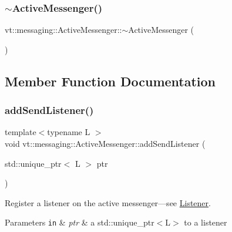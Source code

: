 \subsubsection{\texorpdfstring{$\sim$\+Active\+Messenger()}{~ActiveMessenger()}}
{\footnotesize\ttfamily vt\+::messaging\+::\+Active\+Messenger\+::$\sim$\+Active\+Messenger (\begin{DoxyParamCaption}{ }\end{DoxyParamCaption})\hspace{0.3cm}{\ttfamily [virtual]}}



\subsection{Member Function Documentation}
\mbox{\label{structvt_1_1messaging_1_1_active_messenger_a3083324696bb4f6e55164da2cb00a1c6}} 
\subsubsection{\texorpdfstring{add\+Send\+Listener()}{addSendListener()}}
{\footnotesize\ttfamily template$<$typename L $>$ \\
void vt\+::messaging\+::\+Active\+Messenger\+::add\+Send\+Listener (\begin{DoxyParamCaption}\item[{std\+::unique\+\_\+ptr$<$ L $>$}]{ptr }\end{DoxyParamCaption})\hspace{0.3cm}{\ttfamily [inline]}}



Register a listener on the active messenger---see {\ttfamily \hyperlink{structvt_1_1messaging_1_1_listener}{Listener}}. 


\begin{DoxyParams}[1]{Parameters}
\mbox{\tt in}  & {\em ptr} & a {\ttfamily std\+::unique\+\_\+ptr$<$\+L$>$} to a listener \\
\hline
\end{DoxyParams}
\mbox{\label{structvt_1_1messaging_1_1_active_messenger_af7bcc5ce345c1138a67b6f80abb56705}} 
